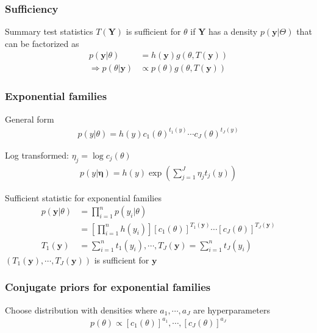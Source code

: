     \subsubsection{Sufficiency}

    Summary test statistics $T(\mathbf{Y})$ is sufficient
    for $\theta$ if $\mathbf{Y}$ has a density
    $p(\mathbf{y}|\Theta)$ that can be factorized as
    \begin{align*}
        p(\mathbf{y}|\theta) &= h(\mathbf{y})g(\theta,
        T(\mathbf{y}))\\
        \Rightarrow p(\theta|\mathbf{y}) &\propto
        p(\theta)g(\theta, T(\mathbf{y}))
    \end{align*}

    \subsubsection{Exponential families}

    General form
    \begin{align*}
        p(y|\theta) = h(y)c_1(\theta)^{t_1(y)}\cdots
        c_J(\theta)^{t_J(y)}
    \end{align*}

    Log transformed: $\eta_j = \log c_j(\theta)$
    \begin{align*}
        p(y|\mathbf{\eta}) = h(y) \exp\left(
            \sum_{j=1}^J \eta_j t_j(y)
        \right)
    \end{align*}

    Sufficient statistic for exponential families
    \begin{align*}
        p(\mathbf{y}|\theta)
        &= \prod_{i=1}^n p(y_i|\theta)\\
        &= \left[\prod_{i=1}^n h(y_i)\right]
        [c_1(\theta)]^{T_1(\mathbf{y})}
        \cdots
        [c_J(\theta)]^{T_J(\mathbf{y})}\\
        T_1(\mathbf{y}) &= \sum_{i=1}^n t_1(y_i),
        \cdots,
        T_J(\mathbf{y}) = \sum_{i=1}^n t_J(y_i)
    \end{align*}
    $(T_1(\mathbf{y}), \cdots, T_J(\mathbf{y}))$ is
    sufficient for $\mathbf{y}$

    \subsubsection{Conjugate priors for exponential families}

    Choose distribution with densities where $a_1, \cdots,
    a_J$ are hyperparameters
    \begin{align*}
        p(\theta) \propto [c_1(\theta)]^{a_1}, \cdots,
        [c_J(\theta)]^{a_J}
    \end{align*}

